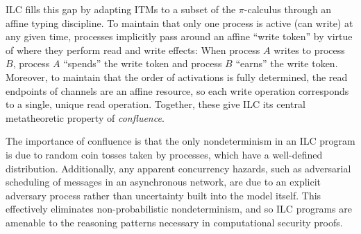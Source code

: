 ILC fills this gap by adapting ITMs to a subset of the $\pi$-calculus through an
affine typing discipline. To maintain that only one process is active (can
write) at any given time, processes implicitly pass around an affine ``write
token'' by virtue of where they perform read and write effects: When process $A$
writes to process $B$, process $A$ ``spends'' the write token and process $B$
``earns'' the write token. Moreover, to maintain that the order of activations
is fully determined, the read endpoints of channels are an affine resource, so
each write operation corresponds to a single, unique read operation. Together,
these give ILC its central metatheoretic property of \emph{confluence}.

The importance of confluence is that the only nondeterminism in an ILC program
is due to random coin tosses taken by processes, which have a well-defined
distribution. Additionally, any apparent concurrency hazards, such as
adversarial scheduling of messages in an asynchronous network, are due to an
explicit adversary process rather than uncertainty built into the model
itself. This effectively eliminates non-probabilistic nondeterminism, and so ILC
programs are amenable to the reasoning patterns necessary in computational
security proofs.





